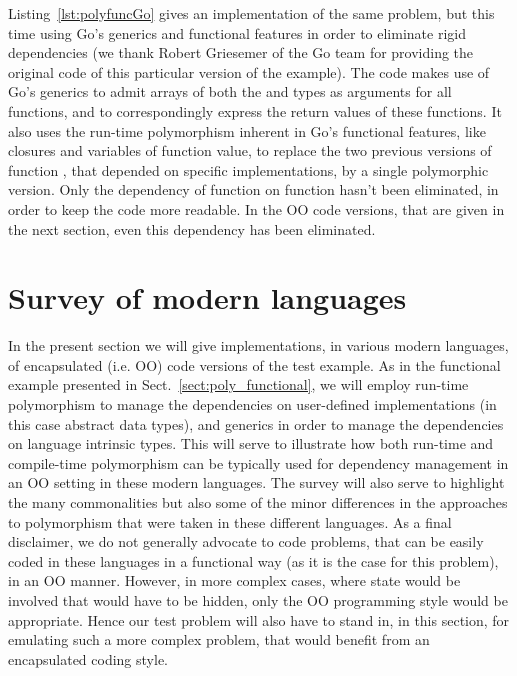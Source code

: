 \documentclass[11pt,oneside]{article}
\newcommand{\code}[1]{{\selectfont\ttfamily{#1}}}
\begin{document}
Listing~\ref{lst:polyfuncGo} gives an implementation of the same
problem, but this time using Go's generics and functional features in
order to eliminate rigid dependencies (we thank Robert Griesemer of
the Go team for providing the original code of this particular version
of the example). The code makes use of Go's generics to admit arrays
of both the \code{int} and \code{float64} types as arguments for all
functions, and to correspondingly express the return values of these
functions. It also uses the run-time polymorphism inherent in Go's
functional features, like closures and variables of function value, to
replace the two previous versions of function \code{average}, that
depended on specific implementations, by a single polymorphic
version. Only the dependency of function \code{pairwise\_sum} on
function \code{simple\_sum} hasn't been eliminated, in order to keep
the code more readable. In the OO code versions, that are given in the
next section, even this dependency has been eliminated.



\section{Survey of modern languages}
\label{sect:survey}

In the present section we will give implementations, in various modern
languages, of encapsulated (i.e. OO) code versions of the test
example. As in the functional example presented in
Sect.~\ref{sect:poly_functional}, we will employ run-time polymorphism
to manage the dependencies on user-defined implementations (in this
case abstract data types), and generics in order to manage the
dependencies on language intrinsic types. This will serve to
illustrate how both run-time and compile-time polymorphism can be
typically used for dependency management in an OO setting in these
modern languages. The survey will also serve to highlight the many
commonalities but also some of the minor differences in the approaches
to polymorphism that were taken in these different languages. As a
final disclaimer, we do not generally advocate to code problems, that
can be easily coded in these languages in a functional way (as it is
the case for this problem), in an OO manner. However, in more complex
cases, where state would be involved that would have to be hidden,
only the OO programming style would be appropriate. Hence our test
problem will also have to stand in, in this section, for emulating
such a more complex problem, that would benefit from an encapsulated
coding style.
\end{document}
